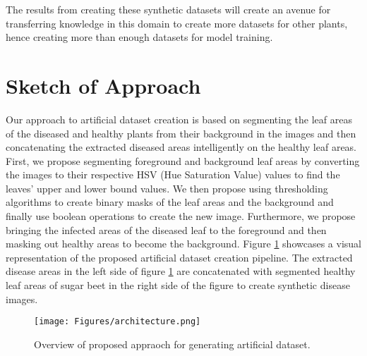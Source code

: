 The results from creating these synthetic datasets will create an avenue for transferring knowledge in this domain to create more datasets for other plants, hence creating more than enough datasets for model training.

\section{Sketch of Approach}
\label{sec:Overview}

Our approach to artificial dataset creation is based on segmenting the leaf areas of the diseased and healthy plants from their background in the images and then concatenating the extracted diseased areas intelligently on the healthy leaf areas. First, we propose segmenting foreground and background leaf areas by converting the images to their respective HSV (Hue Saturation Value) values to find the leaves’ upper and lower bound values. We then propose using thresholding algorithms to create binary masks of the leaf areas and the background and finally use boolean operations to create the new image. Furthermore, we propose bringing the infected areas of the diseased leaf to the foreground and then masking out healthy areas to become the background. Figure \ref{fig:my_arch} showcases a visual representation of the proposed artificial dataset creation pipeline. 
The extracted disease areas in the left side of figure \ref{fig:my_arch} are concatenated with segmented healthy leaf areas of sugar beet in the right side of the figure to create synthetic disease images.

\begin{figure}[!htb]
    \centering
    \texttt{[image: Figures/architecture.png]}
    \caption{Overview of proposed appraoch for generating artificial dataset.}
    \label{fig:my_arch}
\end{figure}

